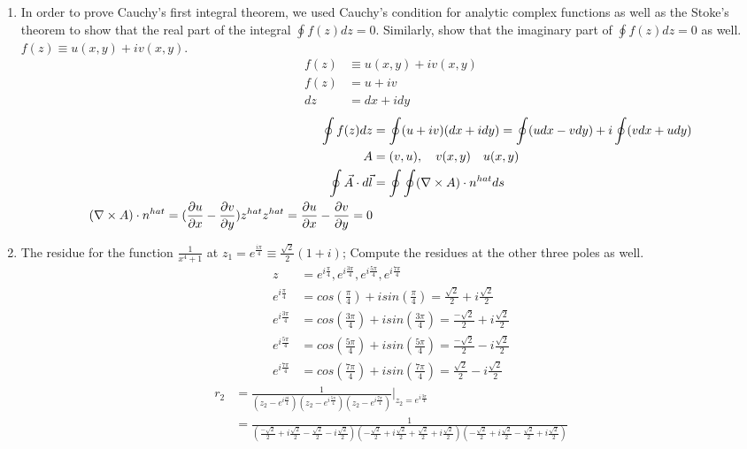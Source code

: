 \documentclass[12pt]{article}
\begin{document}
\begin{enumerate}
	\item In order to prove Cauchy's first integral theorem, we used Cauchy's condition for analytic complex functions as well as the Stoke's theorem to show that the real part of the integral $\oint f(z)dz=0$. Similarly, show that the imaginary part of $\oint f(z)dz=0$ as well. $f(z) \equiv u(x,y)+iv(x,y)$.
		\begin{align*}
			f(z)&\equiv u(x,y)+iv(x,y)\\
			f(z)&=u+iv\\
			dz&= dx+idy
		\end{align*}
		\begin{align*}
			\oint f(z)dz&= \oint (u+iv)(dx+idy)=\oint (udx-vdy)+i \oint(vdx+udy)\\
			A&=(v,u),\quad v(x,y) \quad u(x,y)\\
			\oint \vec{A} \cdot d \vec{l} &= \oint \oint(\nabla \times A)\cdot n^{hat} ds\\
			(\nabla \times A) \cdot n^{hat} = (\pdv{u}{x}-\pdv{v}{y})z^{hat}z^{hat}=\pdv{u}{x}-\pdv{v}{y}=0
		\end{align*}
	\item The residue for the function $\frac{1}{x^{4}+1}$ at $z_{1}=e^{\frac{i\pi}{4}} \equiv \frac{\sqrt{2}}{2}(1+i)$; Compute the residues at the other three poles as well.
		\begin{align*}
			z&=e^{i \frac{\pi}{4}},e^{i \frac{3\pi}{4}}, e^{i \frac{5\pi}{4}}, e^{i \frac{7\pi}{4}}\\
			e^{i \frac{\pi}{4}}&=cos(\frac{\pi}{4})+isin(\frac{\pi}{4})=\frac{\sqrt{2}}{2}+i \frac{\sqrt{2}}{2}\\
			e^{i \frac{3\pi}{4}}&=cos(\frac{3\pi}{4})+isin(\frac{3\pi}{4})=\frac{-\sqrt{2}}{2}+i \frac{\sqrt{2}}{2}\\
			e^{i \frac{5\pi}{4}}&=cos(\frac{5\pi}{4})+isin(\frac{5\pi}{4})=\frac{-\sqrt{2}}{2}-i \frac{\sqrt{2}}{2}\\
			e^{i \frac{7\pi}{4}}&=cos(\frac{7\pi}{4})+isin(\frac{7\pi}{4})=\frac{\sqrt{2}}{2}-i \frac{\sqrt{2}}{2}
		\end{align*}
		\begin{align*}
			r_{2}&=\frac{1}{(z_{2}-e^{i \frac{pi}{4}})(z_{2}-e^{i \frac{5\pi}{4}})(z_{2}-e^{i \frac{7\pi}{4}})}|_{z_{2} = e^{i \frac{3\pi}{4}}}\\
			     &=\frac{1}{(\frac{-\sqrt{2}}{2}+i \frac{\sqrt{2}}{2}-\frac{\sqrt{2}}{2}-i \frac{\sqrt{2}}{2})(-\frac{\sqrt{2}}{2}+i \frac{\sqrt{2}}{2}+\frac{\sqrt{2}}{2}+i \frac{\sqrt{2}}{2})(-\frac{\sqrt{2}}{2}+i \frac{\sqrt{2}}{2}-\frac{\sqrt{2}}{2}+i \frac{\sqrt{2}}{2})}\\

\end{align*}
\end{enumerate}
\end{document}
